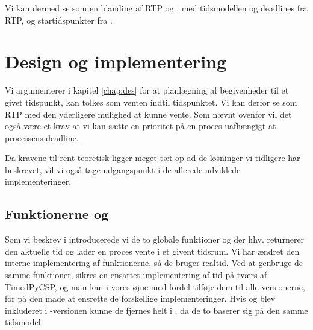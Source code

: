Vi kan dermed se \is som en blanding af RTP og \des, med tidsmodellen og deadlines fra RTP, og startidspunkter fra \des. 



\section{Design og implementering} 
Vi argumenterer i kapitel \ref{chap:des} for at planlægning af begivenheder til et givet tidspunkt, kan tolkes som venten indtil tidspunktet. Vi kan derfor se \is som RTP med den yderligere mulighed at kunne vente. Som nævnt ovenfor vil det også være et krav at vi kan sætte en prioritet på en proces uafhængigt at processens deadline. 

Da kravene til \is rent teoretisk ligger meget tæt op ad de løsninger vi tidligere har beskrevet, vil vi også tage udgangspunkt i de allerede udviklede implementeringer. 


\subsection{Funktionerne  og }
Som vi beskrev i \des introducerede vi de to globale funktioner  og  der hhv. returnerer den aktuelle tid og lader en proces vente i et givent tidsrum. Vi har ændret den interne implementering af funktionerne, så de bruger realtid. Ved at genbruge de samme funktioner, sikres en ensartet implementering af tid på tværs af TimedPyCSP, og man kan i vores øjne med fordel tilføje dem til alle \pycsp versionerne, for på den måde at ensrette de forskellige implementeringer. Hvis  og  blev inkluderet i -versionen kunne de fjernes helt i \is, da de to baserer sig på den samme tidsmodel.

